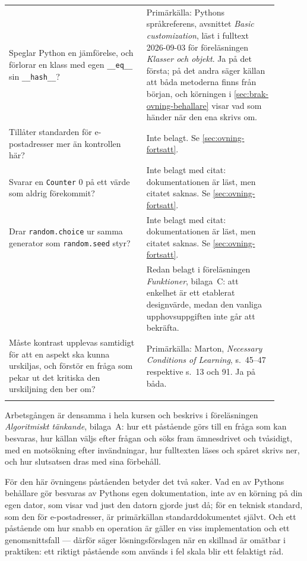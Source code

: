 \begin{table}[!htb]
\begin{tabular}{@{}p{0.46\linewidth}p{0.44\linewidth}@{}}
    Speglar Python en jämförelse, och förlorar en klass med egen
    \texttt{__eq__} sin \texttt{__hash__}?
      & Primärkälla: Pythons språkreferens, avsnittet \emph{Basic
        customization}, läst i fulltext 2026-09-03 för föreläsningen
        \emph{Klasser och objekt}.  Ja på det första; på det andra säger
        källan att båda metoderna finns från början, och körningen i
        \cref{sec:brak-ovning-behallare} visar vad som händer när den ena
        skrivs om. \\
    Tillåter standarden för e-postadresser mer än kontrollen här?
      & Inte belagt.  Se \cref{sec:ovning-fortsatt}. \\
    Svarar en \texttt{Counter} \(0\) på ett värde som aldrig
    förekommit?
      & Inte belagt med citat: dokumentationen är läst, men citatet
        saknas.  Se \cref{sec:ovning-fortsatt}. \\
    Drar \texttt{random.choice} ur samma generator som
    \texttt{random.seed} styr?
      & Inte belagt med citat: dokumentationen är läst, men citatet
        saknas.  Se \cref{sec:ovning-fortsatt}. \\
    \ifbool{ltnote}{%
    Ska lösningen hållas enkel (\foreignlanguage{english}{KISS})?
      & Redan belagt i föreläsningen \emph{Funktioner}, bilaga~C: att
        enkelhet är ett etablerat designvärde, medan den vanliga
        upphovsuppgiften inte går att bekräfta. \\
    Måste kontrast upplevas samtidigt för att en aspekt ska kunna
    urskiljas, och förstör en fråga som pekar ut det kritiska den
    urskiljning den ber om?
      & Primärkälla: Marton, \emph{Necessary Conditions of Learning},
        s.~45--47 respektive s.~13 och 91.  Ja på båda. \\
    }{}%
    \bottomrule
  \end{tabular}
\end{table}

Arbetsgången är densamma i hela kursen och beskrivs i
föreläsningen \emph{Algoritmiskt tänkande}, bilaga~A: hur ett påstående
görs till en fråga som kan besvaras, hur källan väljs efter frågan och
söks fram ämnesdrivet och tvåsidigt, med en motsökning efter
invändningar, hur fulltexten läses och spåret skrivs ner, och hur
slutsatsen dras med sina förbehåll.

För den här övningens påståenden betyder det två saker.  Vad en av
Pythons behållare gör besvaras av Pythons egen dokumentation, inte av
en körning på din egen dator, som visar vad just den datorn gjorde just
då; för en teknisk standard, som den för e-postadresser, är
primärkällan standarddokumentet självt.  Och ett påstående om hur snabb
en operation är gäller en viss implementation och ett genomsnittsfall
--- därför säger lösningsförslagen när en skillnad är omätbar i
praktiken: ett riktigt påstående som används i fel skala blir ett
felaktigt råd.

